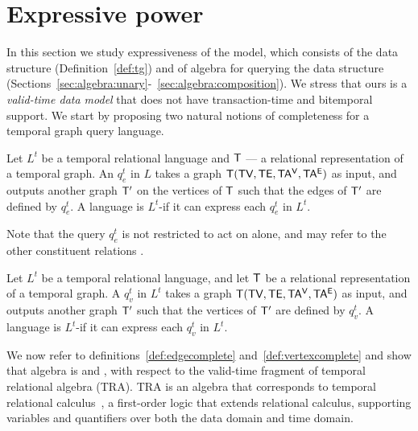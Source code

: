 \section{Expressive power}
\label{sec:formal}

In this section we study expressiveness of the \tg model, which
consists of the \tg data structure (Definition~\ref{def:tg}) and of
\tg algebra for querying the data structure
(Sections~\ref{sec:algebra:unary}-~\ref{sec:algebra:composition}).  We
stress that ours is a {\em valid-time data model} that does not have
transaction-time and bitemporal support.  We start by proposing two
natural notions of completeness for a temporal graph query language.

\begin{definition}
  Let $L^t$ be a temporal relational language and $\mathsf{T}$ --- a
  relational representation of a temporal graph.  An \edgeq $q^t_e$ in
  $L$ takes a graph $\mathsf{T} (\textsf{TV}, \textsf{TE}, \mathsf{TA^{V}}, \mathsf{TA^{E}})$ as input, and
  outputs another graph $\mathsf{T}'$ on the vertices of $\mathsf{T}$ such that
  the edges of $\mathsf{T}'$ are defined by $q^t_e$.  A language is
  $L^t$-\edgec if it can express each $q^t_e$ in $L^t$.
  \label{def:edgecomplete}
\end{definition}

Note that the query $q^t_e$ is not restricted to act on \te alone, and
may refer to the other constituent relations \tve.


\begin{definition}
  Let $L^t$ be a temporal relational language, and let $\mathsf{T}$ be a
  relational representation of a temporal graph.  A \vertexq $q^t_v$
  in $L^t$ takes a graph $\mathsf{T} (\textsf{TV}, \textsf{TE}, \mathsf{TA^{V}}, \mathsf{TA^{E}})$ as input, and
  outputs another graph $\mathsf{T}'$ such that the vertices of $\mathsf{T}'$ are
  defined by $q^t_v$. A language is $L^t$-\vertexc if it can express
  each $q^t_v$ in $L^t$.
\label{def:vertexcomplete}
\end{definition}

We now refer to definitions~\ref{def:edgecomplete}
and~\ref{def:vertexcomplete} and show that \ql algebra is \edgec and
\vertexc, with respect to the valid-time fragment of temporal
relational algebra (TRA).  TRA is an algebra that corresponds to
temporal relational calculus~\cite{DBLP:reference/db/ChomickiT09b}, a
first-order logic that extends relational calculus, supporting
variables and quantifiers over both the data domain and time domain.

